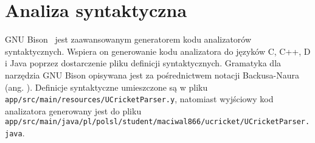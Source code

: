 
\section{Analiza syntaktyczna}
GNU Bison \cytowanie\ jest zaawansowanym generatorem kodu analizatorów syntaktycznych. Wspiera on generowanie kodu analizatora do języków C, C++, D i Java poprzez dostarczenie pliku definicji syntaktycznych. Gramatyka dla narzędzia GNU Bison opisywana jest za pośrednictwem notacji Backusa-Naura (ang. ). Definicje syntaktyczne umieszczone są w pliku \lstinline|app/src/main/resources/UCricketParser.y|, natomiast wyjściowy kod analizatora generowany jest do pliku \lstinline|app/src/main/java/pl/polsl/student/maciwal866/ucricket/UCricketParser.java|.

